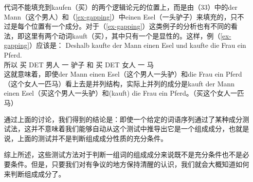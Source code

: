 \eal
{}
\zl
代词不能填充到kaufen（买）的两个逻辑论元的位置上，而是由（33）中的der Mann（这个男人）和（\ref{ex-gapping}）中einen Esel（一头驴子）来填充的，只不过是每个位置有一个成分。对于（\ref{ex-gapping}）这类例子的分析也有不同的看法，即这里有两个动词kauft（买），其中只有一个是显性的\citep{Crysmann2003c}。这样，例（\ref{ex-gapping}）应该是：
\ea
\gll Deshalb kaufte der Mann einen Esel und kaufte die Frau ein Pferd.\\
	所以 买 DET 男人 一 驴子 和 买 DET 女人 一 马\\
\z
这就意味着，即使der Mann einen Esel（这个男人一头驴）和die Frau ein Pferd（这个女人一匹马）看上去是并列结构，实际上并列的成分是kauft der Mann einen Esel（买这个男人一头驴）和(kauft) die Frau ein Pferd。（买这个女人一匹马）

通过上面的讨论，我们得到的结论是：即使一个给定的词语序列通过了某种成分测试法，这并不意味着我们能够自动从这个测试中推导出它是一个组成成分，也就是说，上面的测试并不是判断组成成分性质的充分条件。

综上所述，这些测试方法对于判断一组词的组成成分来说既不是充分条件也不是必要条件。但是，只要我们对有争议的地方保持清醒的认识，我们就会大概知道如何来判断组成成分了。

